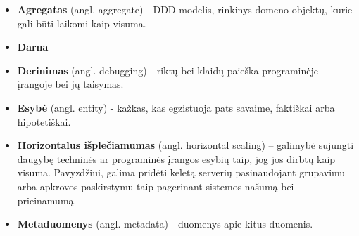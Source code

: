 \begin{itemize}

  \item \textbf{Agregatas} (angl. aggregate) - DDD modelis, rinkinys domeno objektų, kurie gali būti laikomi kaip visuma.

  \item \textbf{Darna}

  \item \textbf{Derinimas} (angl. debugging) - riktų bei klaidų paieška programinėje įrangoje bei jų taisymas.

  \item \textbf{Esybė} (angl. entity) - kažkas, kas egzistuoja pats savaime, faktiškai arba hipotetiškai.

  \item \textbf{Horizontalus išplečiamumas} (angl. horizontal scaling) – galimybė sujungti daugybę techninės ar programinės įrangos esybių taip, jog jos dirbtų kaip visuma. Pavyzdžiui, galima pridėti keletą serverių pasinaudojant grupavimu arba apkrovos paskirstymu taip pagerinant sistemos našumą bei prieinamumą.

  \item \textbf{Metaduomenys} (angl. metadata) - duomenys apie kitus duomenis.

\end{itemize}
